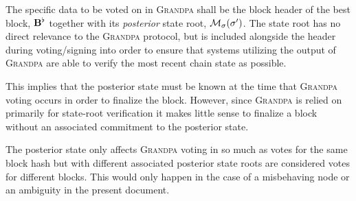 The specific data to be voted on in \textsc{Grandpa} shall be the block header of the best block, $\mathbf{B}^\flat$ together with its \emph{posterior} state root, $\merklizestate{\thestate'}$. The state root has no direct relevance to the \textsc{Grandpa} protocol, but is included alongside the header during voting/signing into order to ensure that systems utilizing the output of \textsc{Grandpa} are able to verify the most recent chain state as possible.

This implies that the posterior state must be known at the time that \textsc{Grandpa} voting occurs in order to finalize the block. However, since \textsc{Grandpa} is relied on primarily for state-root verification it makes little sense to finalize a block without an associated commitment to the posterior state.

The posterior state only affects \textsc{Grandpa} voting in so much as votes for the same block hash but with different associated posterior state roots are considered votes for different blocks. This would only happen in the case of a misbehaving node or an ambiguity in the present document.
